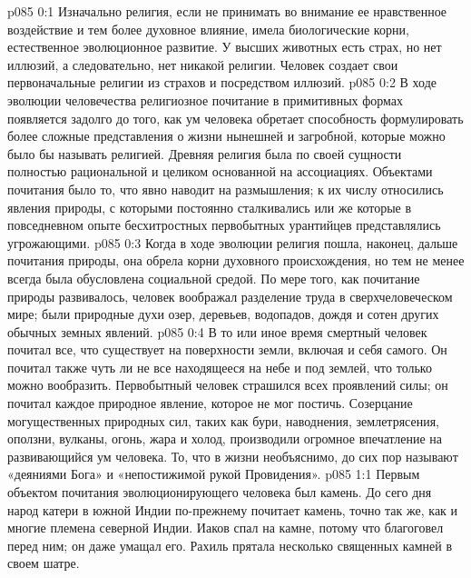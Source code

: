 \author{Блестящая Вечерняя Звезда}
\vs p085 0:1 Изначально религия, если не принимать во внимание ее нравственное воздействие и тем более духовное влияние, имела биологические корни, естественное эволюционное развитие. У высших животных есть страх, но нет иллюзий, а следовательно, нет никакой религии. Человек создает свои первоначальные религии из страхов и посредством иллюзий.
\vs p085 0:2 В ходе эволюции человечества религиозное почитание в примитивных формах появляется задолго до того, как ум человека обретает способность формулировать более сложные представления о жизни нынешней и загробной, которые можно было бы называть религией. Древняя религия была по своей сущности полностью рациональной и целиком основанной на ассоциациях. Объектами почитания было то, что явно наводит на размышления; к их числу относились явления природы, с которыми постоянно сталкивались или же которые в повседневном опыте бесхитростных первобытных урантийцев представлялись угрожающими.
\vs p085 0:3 Когда в ходе эволюции религия пошла, наконец, дальше почитания природы, она обрела корни духовного происхождения, но тем не менее всегда была обусловлена социальной средой. По мере того, как почитание природы развивалось, человек воображал разделение труда в сверхчеловеческом мире; были природные духи озер, деревьев, водопадов, дождя и сотен других обычных земных явлений.
\vs p085 0:4 В то или иное время смертный человек почитал все, что существует на поверхности земли, включая и себя самого. Он почитал также чуть ли не все находящееся на небе и под землей, что только можно вообразить. Первобытный человек страшился всех проявлений силы; он почитал каждое природное явление, которое не мог постичь. Созерцание могущественных природных сил, таких как бури, наводнения, землетрясения, оползни, вулканы, огонь, жара и холод, производили огромное впечатление на развивающийся ум человека. То, что в жизни необъяснимо, до сих пор называют «деяниями Бога» и «непостижимой рукой Провидения».
\vs p085 1:1 Первым объектом почитания эволюционирующего человека был камень. До сего дня народ катери в южной Индии по\hyp{}прежнему почитает камень, точно так же, как и многие племена северной Индии. Иаков спал на камне, потому что благоговел перед ним; он даже умащал его. Рахиль прятала несколько священных камней в своем шатре.
